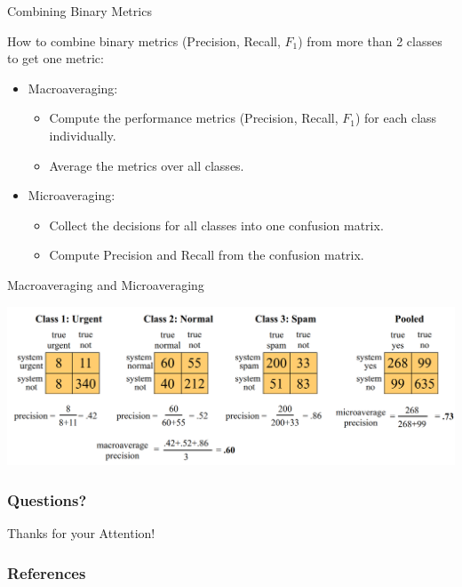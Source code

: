 \documentclass[handout]{beamer}
\begin{document}
\begin{frame}{Combining Binary Metrics}

How to combine binary metrics (Precision, Recall, $F_1$) from more than 2 classes to get one metric:
\begin{itemize}
 \item Macroaveraging:
 \begin{itemize}
    \item Compute the performance metrics (Precision, Recall, $F_1$) for each class individually.
    \item Average the metrics over all classes.
 \end{itemize}
 \item Microaveraging:
 \begin{itemize}
    \item Collect the decisions for all classes into one confusion matrix.
    \item Compute Precision and Recall from the confusion matrix.
 \end{itemize}
\end{itemize}
\end{frame}


\begin{frame}{Macroaveraging and Microaveraging}


\begin{center}
\includegraphics[scale=0.23]{pics/confmatrixmulti.png}
\end{center}

\end{frame}


\begin{frame}
\frametitle{Questions?}
\begin{center}\LARGE Thanks for your Attention!\\ \end{center}



\end{frame}




\begin{frame}[allowframebreaks]\scriptsize
\frametitle{References}


%
\end{frame}  


\end{document}
